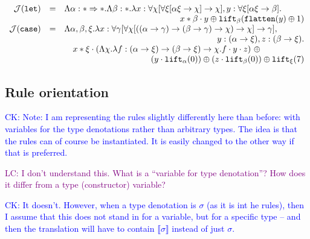 \documentclass[runningheads,a4paper]{llncs}
\newcommand{\Termmap}{\mathcal{J}}
\newcommand{\quant}[2]{\forall #1[#2]}
\newcommand{\typeinterpret}[1]{\llbracket #1 \rrbracket}
\newcommand{\arrtype}{\rightarrow}
\newcommand{\arrkind}{\Rightarrow}
\newcommand{\abs}[2]{\lambda #1.#2}
\newcommand{\flatten}{\mathtt{flatten}}
\newcommand{\lift}{\mathtt{lift}}
\newcommand{\CK}[1]{\textcolor{blue}{CK: #1}}
\newcommand{\LC}[1]{\textcolor{purple}{LC: #1}}
\begin{document}
\[
\begin{array}{rcl}
\Termmap(\mathtt{let}) & = & \Lambda \alpha : * \arrkind * . \Lambda \beta : * . \lambda x : \quant{\chi}{
  \quant{\xi}{\alpha\xi \arrtype \chi} \arrtype \chi},
  y : \quant{\xi}{\alpha\xi \arrtype \beta}. \\
  & & \hfill x * \beta \cdot y \oplus \lift_{\beta}(\flatten(y) \oplus
  1) \\
\Termmap(\mathtt{case}) & = & \Lambda \alpha,\beta,\xi . \lambda x :
  \quant{\gamma}{\quant{\chi}{((\alpha \arrtype \gamma) \arrtype (\beta
  \arrtype \gamma) \arrtype \chi) \arrtype \chi} \arrtype \gamma},\\
  & & \phantom{A}\hfill
  y : (\alpha \arrtype \xi), z : (\beta \arrtype \xi). \\
  & & \quad
  x * \xi \cdot (\Lambda \chi.\abs{f:(\alpha \arrtype \xi) \arrtype
  (\beta \arrtype \xi) \arrtype \chi}{f \cdot y \cdot z})\ \oplus \\
  & & \quad\phantom{ABCDEFGHIJKL}
    (y \cdot \lift_\alpha(0)) \oplus (z \cdot \lift_\beta(0)) \oplus
    \lift_\xi(7) \\
\end{array}
\]

\subsection{Rule orientation}

\CK{Note: I am representing the rules slightly differently here than
before: with variables for the type denotations rather than arbitrary
types.  The idea is that the rules can of course be instantiated.  It
is easily changed to the other way if that is preferred.}

\LC{I don't understand this. What is a ``variable for type
  denotation''? How does it differ from a type (constructor)
  variable?}

\CK{It doesn't. However, when a type denotation is $\sigma$ (as it is
  int he rules), then I assume that this does not stand in for a
  variable, but for a specific type -- and then the translation will
  have to contain $\typeinterpret{\sigma}$ instead of just $\sigma$.}
\end{document}
